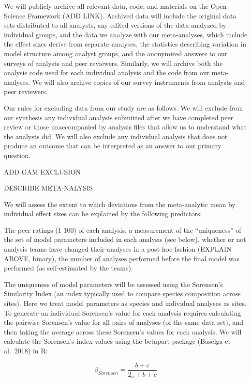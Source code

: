 \documentclass[
  english,
  man]{apa6}
\begin{document}
We will publicly archive all relevant data, code, and materials on the Open Science Framework (ADD LINK).
Archived data will include the original data sets distributed to all analysts, any edited versions of the data analyzed by individual groups, and the data we analyze with our meta-analyses, which include the effect sizes derive from separate analyses, the statistics describing variation in model structure among analyst groups, and the anonymized answers to our surveys of analysts and peer reviewers.
Similarly, we will archive both the analysis code used for each individual analysis and the code from our meta-analyses.
We will also archive copies of our survey instruments from analysts and peer reviewers.

Our rules for excluding data from our study are as follows.
We will exclude from our synthesis any individual analysis submitted after we have completed peer review or those unaccompanied by analysis files that allow us to understand what the analysts did.
We will also exclude any individual analysis that does not produce an outcome that can be interpreted as an answer to our primary question.

ADD GAM EXCLUSION

DESCRIBE META-NALYSIS

We will assess the extent to which deviations from the meta-analytic mean by individual effect sizes can be explained by the following predictors:

The peer ratings (1-100) of each analysis, a measurement of the \enquote{uniqueness} of the set of model parameters included in each analysis (see below), whether or not analysis teams have changed their analyses in a post hoc fashion (EXPLAIN ABOVE, binary), the number of analyses performed before the final model was performed (as self-estimated by the teams).

The uniqueness of model parameters will be assessed using the Sorensen's Similarity Index (an index typically used to compare species composition across sites). Here we treat model parameters as species and individual analyses as sites. To generate an individual Sorensen's value for each analysis requires calculating the pairwise Sorensen's value for all pairs of analyses (of the same data set), and then taking the average across these Sorensen's values for each analysis. We will calculate the Sorensen's index values using the betapart package (Baselga et al.~2018) in R:

\[\beta_{Sorensen} = \frac{b+c}{2_a + b + c}\]
\end{document}
